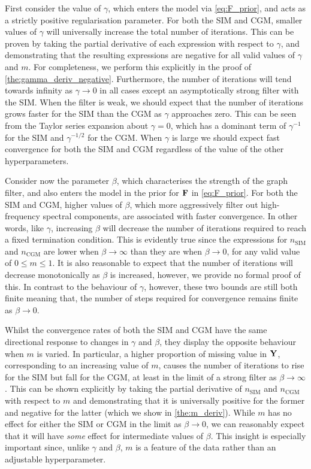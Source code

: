First consider the value of $\gamma$, which enters the model via \cref{eq:F_prior}, and acts as a strictly positive regularisation parameter. For both the SIM and CGM, smaller values of $\gamma$ will universally increase the total number of iterations. This can be proven by taking the partial derivative of each expression with respect to $\gamma$, and demonstrating that the resulting expressions are negative for all valid values of $\gamma$ and $m$. For completeness, we perform this explicitly in the proof of \cref{the:gamma_deriv_negative}. Furthermore, the number of iterations will tend towards infinity as $\gamma \rightarrow 0$ in all cases except an asymptotically strong filter with the SIM. When the filter is weak, we should expect that the number of iterations grows faster for the SIM than the CGM as $\gamma$ approaches zero. This can be seen from the Taylor series expansion about $\gamma = 0$, which has a dominant term of $\gamma^{-1}$ for the SIM and $\gamma^{-1/2}$ for the CGM. When $\gamma$ is large we should expect fast convergence for both the SIM and CGM regardless of the value of the other hyperparameters. 

Consider now the parameter $\beta$, which characterises the strength of the graph filter, and also enters the model in the prior for $\mathbf{F}$ in \cref{eq:F_prior}. For both the SIM and CGM, higher values of $\beta$, which more aggressively filter out high-frequency spectral components, are associated with faster convergence. In other words, like $\gamma$, increasing $\beta$ will decrease the number of iterations required to reach a fixed termination condition. This is evidently true since the expressions for $n_\text{SIM}$ and $n_\text{CGM}$ are lower when $\beta \rightarrow \infty$ than they are when $\beta \rightarrow 0$, for any valid value of $0 \leq m \leq 1$. It is also reasonable to expect that the number of iterations will decrease monotonically as $\beta$ is increased, however, we provide no formal proof of this. In contrast to the behaviour of $\gamma$, however, these two bounds are still both finite meaning that, the number of steps required for convergence remains finite as $\beta \rightarrow 0$. 

Whilst the convergence rates of both the SIM and CGM have the same directional response to changes in $\gamma$ and $\beta$, they display the opposite behaviour when $m$ is varied. In particular, a higher proportion of missing value in $\mathbf{Y}$, corresponding to an increasing value of $m$, causes the number of iterations to rise for the SIM but fall for the CGM, at least in the limit of a strong filter as $\beta \rightarrow \infty$. This can be shown explicitly by taking the partial derivative of $n_\text{SIM}$ and $n_\text{CGM}$ with respect to $m$ and demonstrating that it is universally positive for the former and negative for the latter (which we show in \cref{the:m_deriv}). While $m$ has no effect for either the SIM or CGM in the limit as $\beta \rightarrow 0$, we can reasonably expect that it will have \textit{some} effect for intermediate values of $\beta$. This insight is especially important since, unlike $\gamma$ and $\beta$, $m$ is a feature of the data rather than an adjustable hyperparameter. 

